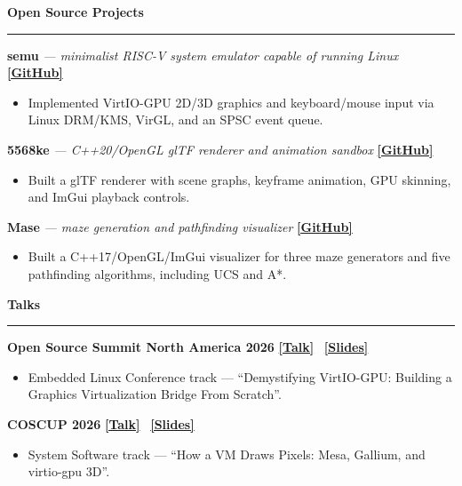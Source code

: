 \documentclass[10pt,a4paper]{article}
\newcommand{\linktag}[2]{%
  \href{#1}{{\color{sectionblue}\textbf{[#2]}}}%
}
\newcommand{\resumesection}[1]{%
  \par\addvspace{7pt}%
  {\fontsize{12.4}{14.2}\selectfont\bfseries\color{sectionblue}#1\par}%
  \vspace{-2pt}%
  {\color{sectionblue}\rule{\linewidth}{0.45pt}}\par
  \vspace{2.2pt}%
}
\begin{document}
\resumesection{Open Source Projects}
\textbf{semu} \textit{--- minimalist RISC-V system emulator capable of running Linux} \linktag{https://github.com/sysprog21/semu}{GitHub}
\begin{itemize}
  \item Implemented VirtIO-GPU 2D/3D graphics and keyboard/mouse input via Linux DRM/KMS, VirGL, and an SPSC event queue.
\end{itemize}
\vspace{2.5pt}

\textbf{5568ke} \textit{--- C++20/OpenGL glTF renderer and animation sandbox} \linktag{https://github.com/Mes0903/5568ke}{GitHub}
\begin{itemize}
  \item Built a glTF renderer with scene graphs, keyframe animation, GPU skinning, and ImGui playback controls.
\end{itemize}
\vspace{2.5pt}

\textbf{Mase} \textit{--- maze generation and pathfinding visualizer} \linktag{https://github.com/Mes0903/Mase}{GitHub}
\begin{itemize}
  \item Built a C++17/OpenGL/ImGui visualizer for three maze generators and five pathfinding algorithms, including UCS and A*.
\end{itemize}

\resumesection{Talks}
\textbf{Open Source Summit North America 2026} \linktag{https://osselcna2026.sched.com/event/2JQrw/demystifying-virtio-gpu-building-a-graphics-virtualization-bridge-from-scratch-yung-tse-cheng-national-taiwan-normal-university-sheng-wen-colin-cheng-the-university-of-texas-at-austin}{Talk}\,
\linktag{https://github.com/Mes0903/talks/blob/main/OSSNA-2026-talk/OSS-NA26-Talk.pptx}{Slides}
\begin{itemize}
  \item Embedded Linux Conference track --- ``Demystifying VirtIO-GPU: Building a Graphics Virtualization Bridge From Scratch''.
\end{itemize}
\vspace{2.5pt}

\textbf{COSCUP 2026} \linktag{https://coscup.org/2026/en/session/N87PMR/}{Talk}\,
\linktag{https://github.com/Mes0903/talks/blob/main/coscup-2026-talk/COSCUP-2026-Mesa-vGPU-3D.pptx}{Slides}
\begin{itemize}
  \item System Software track --- ``How a VM Draws Pixels: Mesa, Gallium, and virtio-gpu 3D''.
\end{itemize}
\end{document}
